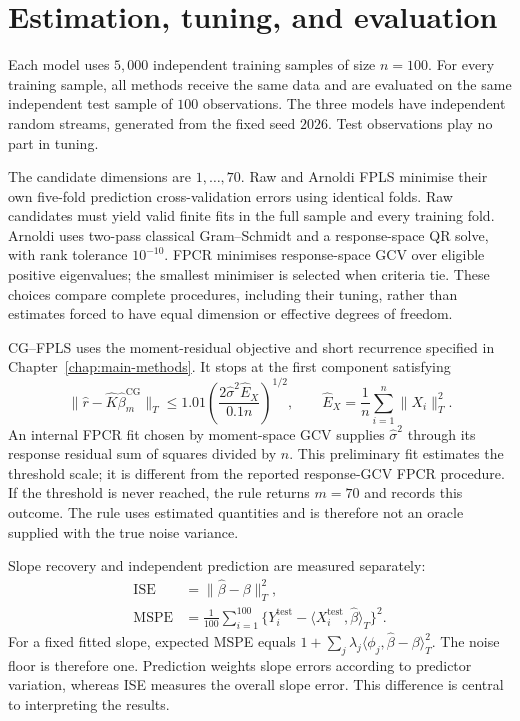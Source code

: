 \section{Estimation, tuning, and evaluation}
\label{main:sec:simulation-evaluation}

Each model uses $5{,}000$ independent training samples of size $n=100$.
For every training sample, all methods receive the same data and are
evaluated on the same independent test sample of $100$ observations.
The three models have independent random streams, generated from the
fixed seed $2026$. Test observations play no part in tuning.

The candidate dimensions are $1,\ldots,70$. Raw and Arnoldi FPLS minimise
their own five-fold prediction cross-validation errors using identical
folds. Raw candidates must yield valid finite fits in the full sample
and every training fold. Arnoldi uses two-pass classical Gram--Schmidt
and a response-space QR solve, with rank tolerance $10^{-10}$. FPCR
minimises response-space GCV over eligible positive eigenvalues; the
smallest minimiser is selected when criteria tie. These choices compare
complete procedures, including their tuning, rather than estimates forced
to have equal dimension or effective degrees of freedom.

CG--FPLS uses the moment-residual objective and short recurrence specified
in Chapter~\ref{chap:main-methods}. It stops at the first component satisfying
\begin{equation}
    \|\widehat r-\widehat K\widehat\beta_m^{\mathrm{CG}}\|_T
    \leq 1.01\left(\frac{2\widehat\sigma^2\widehat E_X}{0.1n}\right)^{1/2},
    \qquad
    \widehat E_X=\frac1n\sum_{i=1}^{n}\|X_i\|_T^2.
    \label{main:eq:simulation-stopping}
\end{equation}
An internal FPCR fit chosen by moment-space GCV supplies
$\widehat\sigma^2$ through its response residual sum of squares divided
by $n$. This preliminary fit estimates the threshold scale; it is
different from the reported response-GCV FPCR procedure. If the threshold
is never reached, the rule returns $m=70$ and records this outcome.
The rule uses estimated quantities and is therefore not an oracle supplied
with the true noise variance.

Slope recovery and independent prediction are measured separately:
\begin{align}
    \operatorname{ISE}
    &=\|\widehat\beta-\beta\|_T^2,
    \label{main:eq:simulation-ise}\\
    \operatorname{MSPE}
    &=\frac1{100}\sum_{i=1}^{100}
      \{Y_i^{\mathrm{test}}-
      \langle X_i^{\mathrm{test}},\widehat\beta\rangle_T\}^{2}.
    \label{main:eq:simulation-mspe}
\end{align}
For a fixed fitted slope, expected MSPE equals
$1+\sum_j\lambda_j\langle\phi_j,\widehat\beta-\beta\rangle_T^2$.
The noise floor is therefore one. Prediction weights slope errors
according to predictor variation, whereas ISE measures the overall slope
error. This difference is central to interpreting the results.

